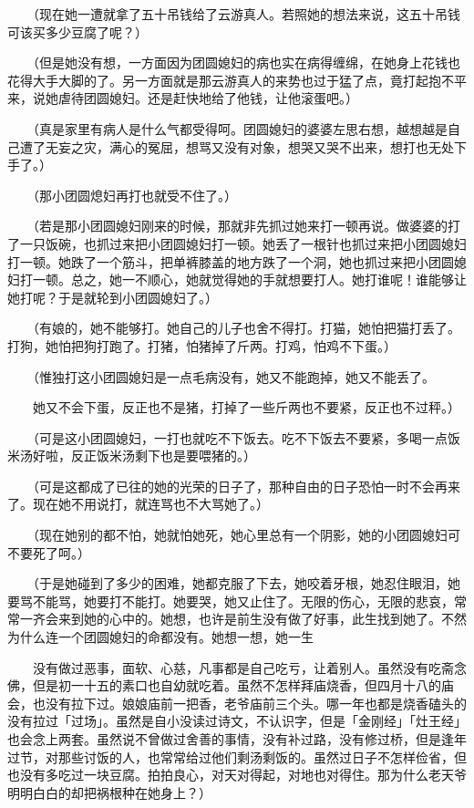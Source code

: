 \documentclass[UTF8]{ctexart}
\begin{document}
　　（现在她一遭就拿了五十吊钱给了云游真人。若照她的想法来说，这五十吊钱可该买多少豆腐了呢？）

　　（但是她没有想，一方面因为团圆媳妇的病也实在病得缠绵，在她身上花钱也花得大手大脚的了。另一方面就是那云游真人的来势也过于猛了点，竟打起抱不平来，说她虐待团圆媳妇。还是赶快地给了他钱，让他滚蛋吧。）

　　（真是家里有病人是什么气都受得呵。团圆媳妇的婆婆左思右想，越想越是自己遭了无妄之灾，满心的冤屈，想骂又没有对象，想哭又哭不出来，想打也无处下手了。）

　　（那小团圆熄妇再打也就受不住了。）

　　（若是那小团圆媳妇刚来的时候，那就非先抓过她来打一顿再说。做婆婆的打了一只饭碗，也抓过来把小团圆媳妇打一顿。她丢了一根针也抓过来把小团圆媳妇打一顿。她跌了一个筋斗，把单裤膝盖的地方跌了一个洞，她也抓过来把小团圆媳妇打一顿。总之，她一不顺心，她就觉得她的手就想要打人。她打谁呢！谁能够让她打呢？于是就轮到小团圆媳妇了。）

　　（有娘的，她不能够打。她自己的儿子也舍不得打。打猫，她怕把猫打丢了。打狗，她怕把狗打跑了。打猪，怕猪掉了斤两。打鸡，怕鸡不下蛋。）

　　（惟独打这小团圆媳妇是一点毛病没有，她又不能跑掉，她又不能丢了。

　　她又不会下蛋，反正也不是猪，打掉了一些斤两也不要紧，反正也不过秤。）

　　（可是这小团圆媳妇，一打也就吃不下饭去。吃不下饭去不要紧，多喝一点饭米汤好啦，反正饭米汤剩下也是要喂猪的。）

　　（可是这都成了已往的她的光荣的日子了，那种自由的日子恐怕一时不会再来了。现在她不用说打，就连骂也不大骂她了。）

　　（现在她别的都不怕，她就怕她死，她心里总有一个阴影，她的小团圆媳妇可不要死了呵。）

　　（于是她碰到了多少的困难，她都克服了下去，她咬着牙根，她忍住眼泪，她要骂不能骂，她要打不能打。她要哭，她又止住了。无限的伤心，无限的悲哀，常常一齐会来到她的心中的。她想，也许是前生没有做了好事，此生找到她了。不然为什么连一个团圆媳妇的命都没有。她想一想，她一生

　　没有做过恶事，面软、心慈，凡事都是自己吃亏，让着别人。虽然没有吃斋念佛，但是初一十五的素口也自幼就吃着。虽然不怎样拜庙烧香，但四月十八的庙会，也没有拉下过。娘娘庙前一把香，老爷庙前三个头。哪一年也都是烧香磕头的没有拉过「过场」。虽然是自小没读过诗文，不认识字，但是「金刚经」「灶王经」也会念上两套。虽然说不曾做过舍善的事情，没有补过路，没有修过桥，但是逢年过节，对那些讨饭的人，也常常给过他们剩汤剩饭的。虽然过日子不怎样俭省，但也没有多吃过一块豆腐。拍拍良心，对天对得起，对地也对得住。那为什么老天爷明明白白的却把祸根种在她身上？）
\end{document}

